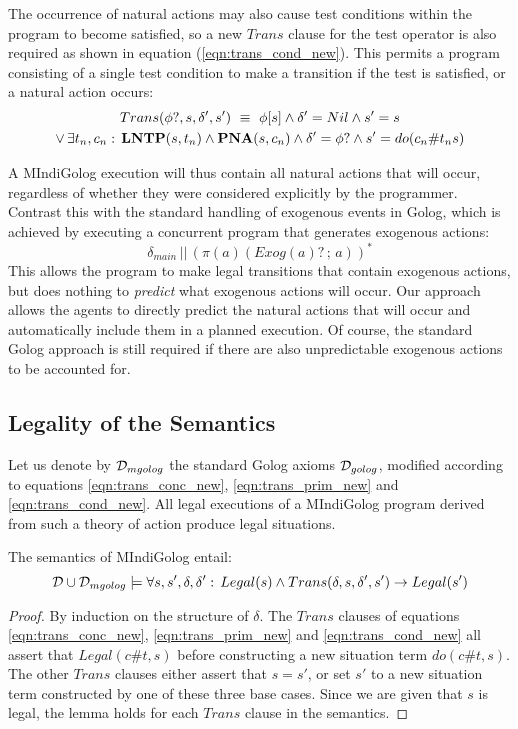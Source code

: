 \newpage{}The occurrence of natural actions may also cause test conditions
within the program to become satisfied, so a new $Trans$ clause for
the test operator is also required as shown in equation (\ref{eqn:trans_cond_new}).
This permits a program consisting of a single test condition to make
a transition if the test is satisfied, or a natural action occurs:
\begin{multline}
Trans(\phi?,s,\delta',s')\,\,\equiv\,\,\phi[s]\wedge\delta'=Nil\wedge s'=s\\
\vee\,\exists t_{n},c_{n}:\,\mathbf{LNTP}(s,t_{n})\wedge\mathbf{PNA}(s,c_{n})\wedge\delta'=\phi?\wedge s'=do(c_{n}\#t_{n}s)\label{eqn:trans_cond_new}\end{multline}


A MIndiGolog execution will thus contain all natural actions that
will occur, regardless of whether they were considered explicitly
by the programmer. Contrast this with the standard handling of exogenous
events in Golog, which is achieved by executing a concurrent program
that generates exogenous actions:\[
\delta_{main}\,||\,\left(\pi(a)(Exog(a)?\,;\, a)\right)^{*}\]
 This allows the program to make legal transitions that contain exogenous
actions, but does nothing to \emph{predict} what exogenous actions
will occur. Our approach allows the agents to directly predict the
natural actions that will occur and automatically include them in
a planned execution. Of course, the standard Golog approach is still
required if there are also unpredictable exogenous actions to be accounted
for.


\subsection{Legality of the Semantics}

Let us denote by $\mathcal{D}_{mgolog}$ the standard Golog axioms $\mathcal{D}_{golog}$,
modified according to equations \eqref{eqn:trans_conc_new}, \eqref{eqn:trans_prim_new}
and \eqref{eqn:trans_cond_new}. All legal executions of a MIndiGolog
program derived from such a theory of action produce legal situations.

\begin{lemma}
The semantics of MIndiGolog entail:\label{lem:MIndiGolog:trans_legal}\[
\mathcal{D}\cup\mathcal{D}_{mgolog}\models\forall s,s',\delta,\delta':\, Legal(s)\wedge Trans(\delta,s,\delta',s')\rightarrow Legal(s')\]

\end{lemma}
\begin{proof}
By induction on the structure of $\delta$. The $Trans$ clauses of
equations \eqref{eqn:trans_conc_new}, \eqref{eqn:trans_prim_new}
and \eqref{eqn:trans_cond_new} all assert that $Legal(c\#t,s)$ before
constructing a new situation term $do(c\#t,s)$. The other $Trans$
clauses either assert that $s=s'$, or set $s'$ to a new situation
term constructed by one of these three base cases. Since we are given
that $s$ is legal, the lemma holds for each $Trans$ clause in the
semantics. 
\end{proof}
\newpage{}

